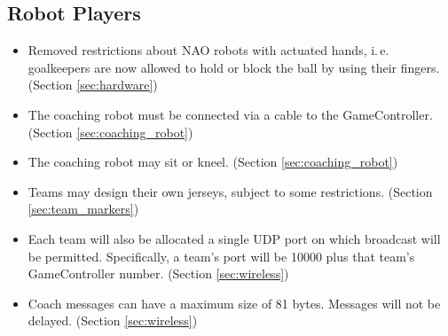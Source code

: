 \documentclass[12pt]{article}
\newcommand{\ie}{\mbox{i.\,e.}\xspace}
\begin{document}
\subsection*{Robot Players}
\begin{itemize}
	\item Removed restrictions about NAO robots with actuated hands, \ie goalkeepers are now allowed to hold or block the ball by using their fingers. (Section \ref{sec:hardware})
	\item The coaching robot must be connected via a cable to the GameController. (Section \ref{sec:coaching_robot})
	\item The coaching robot may sit or kneel. (Section \ref{sec:coaching_robot})
	\item Teams may design their own jerseys, subject to some restrictions. (Section \ref{sec:team_markers})
	\item Each team will also be allocated a single UDP port on which broadcast will be permitted.  Specifically, a team's port will be 10000 plus that team's GameController number. (Section \ref{sec:wireless})
	\item Coach messages can have a maximum size of 81 bytes.  Messages will not be delayed. (Section \ref{sec:wireless})
\end{itemize}
\end{document}
